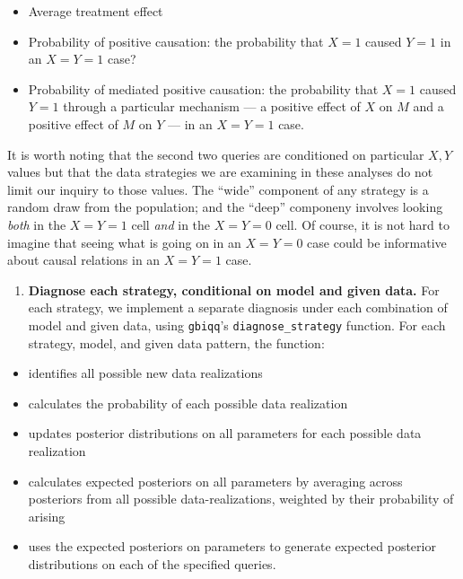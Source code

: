 \documentclass[
  12pt,
]{book}
\providecommand{\tightlist}{%
  \setlength{\itemsep}{0pt}\setlength{\parskip}{0pt}}
\begin{document}
\begin{itemize}
\tightlist
\item
  Average treatment effect
\item
  Probability of positive causation: the probability that \(X=1\) caused \(Y=1\) in an \(X=Y=1\) case?
\item
  Probability of mediated positive causation: the probability that \(X=1\) caused \(Y=1\) through a particular mechanism --- a positive effect of \(X\) on \(M\) and a positive effect of \(M\) on \(Y\) --- in an \(X=Y=1\) case.
\end{itemize}

It is worth noting that the second two queries are conditioned on particular \(X,Y\) values but that the data strategies we are examining in these analyses do not limit our inquiry to those values. The ``wide'' component of any strategy is a random draw from the population; and the ``deep'' componeny involves looking \emph{both} in the \(X=Y=1\) cell \emph{and} in the \(X=Y=0\) cell. Of course, it is not hard to imagine that seeing what is going on in an \(X=Y=0\) case could be informative about causal relations in an \(X=Y=1\) case.

\begin{enumerate}
\def\labelenumi{\arabic{enumi}.}
\setcounter{enumi}{4}
\tightlist
\item
  \textbf{Diagnose each strategy, conditional on model and given data.} For each strategy, we implement a separate diagnosis under each combination of model and given data, using \texttt{gbiqq}'s \texttt{diagnose\_strategy} function. For each strategy, model, and given data pattern, the function:
\end{enumerate}

\begin{itemize}
\tightlist
\item
  identifies all possible new data realizations
\item
  calculates the probability of each possible data realization
\item
  updates posterior distributions on all parameters for each possible data realization
\item
  calculates expected posteriors on all parameters by averaging across posteriors from all possible data-realizations, weighted by their probability of arising
\item
  uses the expected posteriors on parameters to generate expected posterior distributions on each of the specified queries.
\end{itemize}
\end{document}
